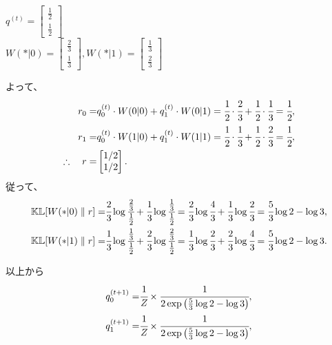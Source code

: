 \begin{example}
$q^{(t)} = \begin{bmatrix} \frac{1}{2} \\ \frac{1}{2} \end{bmatrix}$ \\

	$W (\ast | 0) = \begin{bmatrix} \frac{2}{3} \\ \frac{1}{3} \end{bmatrix},
		W (\ast | 1) = \begin{bmatrix} \frac{1}{3} \\ \frac{2}{3} \end{bmatrix}$

\begin{center}
\end{center}

よって、
\begin{align*}
	r_0
		=& q_0^{(t)} \cdot W(0|0) + q_1^{(t)} \cdot W (0|1)
		= \cfrac{1}{2} \cdot \cfrac{2}{3} + \cfrac{1}{2} \cdot \cfrac{1}{3}
		= \cfrac{1}{2}, \\
	r_1
		=& q_0^{(t)} \cdot W(1|0) + q_1^{(t)} \cdot W (1|1)
		= \cfrac{1}{2} \cdot \cfrac{1}{3} + \cfrac{1}{2} \cdot \cfrac{2}{3}
		= \cfrac{1}{2}, \\
	\therefore\quad
	r =& \begin{bmatrix} 1/2 \\ 1/2 \end{bmatrix}.
\end{align*}
従って、
\begin{align*}
	\mathbb{KL}[W (\ast|0) \parallel r]
	=& \cfrac{2}{3} \log \cfrac{\frac{2}{3}}{\frac{1}{2}} + \cfrac{1}{3} \log \cfrac{\frac{1}{3}}{\frac{1}{2}}
	= \cfrac{2}{3} \log \cfrac{4}{3} + \cfrac{1}{3} \log \cfrac{2}{3} 
	= \cfrac{5}{3} \log 2 - \log 3 , \\
	\mathbb{KL}[ W(\ast|1) \parallel r]
	=& \cfrac{1}{3} \log \cfrac{\frac{1}{3}}{\frac{1}{2}} + \cfrac{2}{3} \log \cfrac{\frac{2}{3}}{\frac{1}{2}}
	= \cfrac{1}{3} \log \cfrac{2}{3} + \cfrac{2}{3} \log \cfrac{4}{3}
	= \cfrac{5}{3} \log 2 - \log 3.
\end{align*}

以上から
\begin{align*}
	q^{(t+1)}_0 
		=& \cfrac{1}{Z} \times \cfrac{1}{2 \exp \left(\frac{5}{3} \log 2 - \log 3 \right)}, \\
	q^{(t+1)}_1
		=& \cfrac{1}{Z} \times \cfrac{1}{2 \exp \left(\frac{5}{3} \log 2 - \log 3 \right)},
\end{align*}
\end{example}






